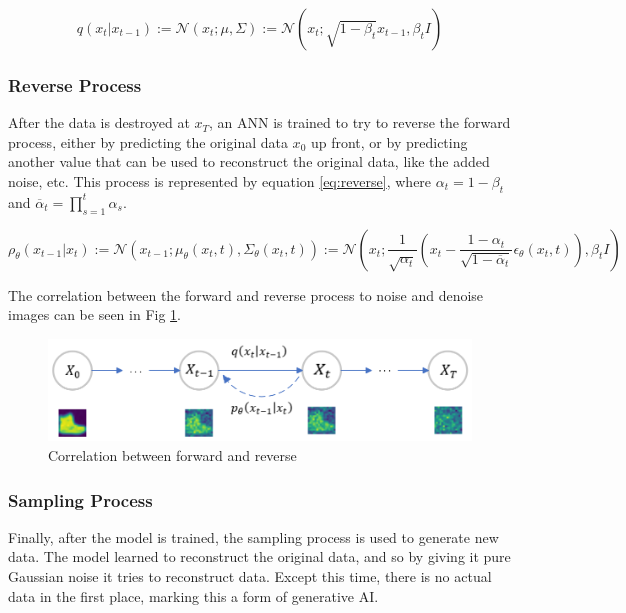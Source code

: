 \documentclass[conference]{IEEEtran}
\begin{document}
	\begin{equation} \label{eq:forward}
	q(x_{t}|x_{t-1}) := \mathcal{N}(x_{t};\mu,\Sigma) := \mathcal{N}(x_{t};\sqrt{1-\beta_{t}}x_{t-1}, \beta_{t}I)
	\end{equation}
	
	\subsubsection{Reverse Process}
	After the data is destroyed at $x_{T}$, an ANN is trained to try to reverse the forward process, either by predicting the original data $x_{0}$ up front, or by predicting another value that can be used to reconstruct the original data, like the added noise, etc. This process is represented by equation \ref{eq:reverse}, where $\alpha_{t}=1-\beta_{t}$ and $\overline{\alpha}_{t}=\prod_{s=1}^{t}\alpha_{s}$.
	
	\begin{equation} \label{eq:reverse}
		\rho_{\theta}(x_{t-1}|x_{t}) := \mathcal{N}(x_{t-1};\mu_{\theta}(x_{t},t),\Sigma_{\theta}(x_{t},t)) := \mathcal{N}(x_{t};\frac{1}{\sqrt{\alpha_{t}}}(x_{t}-\frac{1-\alpha_{t}}{\sqrt{1-\overline{\alpha}_{t}}}\epsilon_{\theta}(x_{t},t)),\beta_{t}I) 
	\end{equation}
	
	The correlation between the forward and reverse process to noise and denoise images can be seen in Fig \ref{fig:forward_reverse}.
	
	\begin{figure}[h]
		\centering
		\includegraphics[width=\linewidth]{figures/ForwardReverseDDPM}
		\setlength{\abovecaptionskip}{0ex}%
		\setlength{\belowcaptionskip}{-2ex}%
		\caption{Correlation between forward and reverse}
		\label{fig:forward_reverse}
	\end{figure}
	
	\subsubsection{Sampling Process}
	Finally, after the model is trained, the sampling process is used to generate new data. The model learned to reconstruct the original data, and so by giving it pure Gaussian noise it tries to reconstruct data. Except this time, there is no actual data in the first place, marking this a form of generative AI.
	
\end{document}
